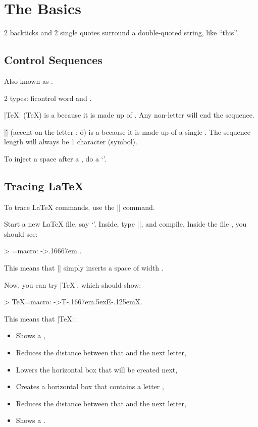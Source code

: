 \chapter{The Basics}

2 backticks and 2 single quotes surround a double-quoted string, like ``this''.

\section{Control Sequences}

Also known as .

2 types: fi{control word} and .

\cil|\TeX| (\TeX) is a  because it is made up of . Any non-letter will end the sequence.

\cil|\'| (accent on the letter : \'o) is a  because it is made up of a single . The sequence length will always be 1 character (symbol).

To inject a space after a , do a `\ttf{\bksl \textvisiblespace}'.

\section{Tracing LaTeX}

To trace LaTeX commands, use the \cil|\show| command.

Start a new LaTeX file, say `'. Inside, type \cil|\show\thinspace|, and compile. Inside the file , you should see:

\begin{outputcfb}
> \thinspace=macro:
->\kern .16667em .
\end{outputcfb}

This means that \cil|\thinspace| simply inserts a space of width \ttf{.16667em}.

Now, you can try \cil|\show\TeX|, which should show:

\begin{outputcfb}
> \TeX=macro:
->T\kern -.1667em\lower .5ex\hbox {E}\kern -.125emX\@.
\end{outputcfb}

This means that \cil|\TeX|:

\begin{itemize}
  \item Shows a ,
  \item Reduces the distance between that and the next letter,
  \item Lowers the horizontal box that will be created next,
  \item Creates a horizontal box that contains a letter ,
  \item Reduces the distance between that and the next letter,
  \item Shows a .
\end{itemize}

